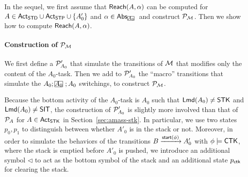 In the sequel, we first assume that ${\sf Reach}(A, \alpha)$ can be computed for $A \in {\sf Act}_{\sf STD} \cup {\sf Act}_{\sf STP} \cup \{A'_0\}$ and $\alpha \in \abs_{\mhcancel{A_0}}$ and construct ${\mathcal{P} }_{\mathcal{M} }$. Then we show how to compute ${\sf Reach}(A, \alpha)$. 

\paragraph*{Construction of ${\mathcal{P} }_{\mathcal{M} }$} 
We first define a {\WOTrPDS} ${\mathcal{P} }'_{A_0}$ that simulate the transitions of ${\mathcal{M} }$ that modifies only the content of the $A_0$-task. Then we add to ${\mathcal{P} }'_{A_0}$ the ``macro'' transitions that simulate the $A_0;\mhcancel{A_0};A_0$ switchings, to construct ${\mathcal{P} }_{\mathcal{M} }$.  

Because the bottom activity of the $A_0$-task is $A_0$ such that ${\sf Lmd}(A_0) \neq \mathsf{STK}$ and ${\sf Lmd}(A_0) \neq \mathsf{SIT}$, the construction of ${\mathcal{P} }'_{A_0}$ is slightly more involved than that of ${\mathcal{P} }_A$ for $A \in {\sf Act}_{\sf STK}$ in Section~\ref{sec:amass-stk}. In particular, we use two states $p_0, p_1$ to distinguish between whether $A'_0$ is in the stack or not. Moreover, in order to simulate the behaviors of the transitions $B \xrightarrow{{\mathsf{start} }(\phi)} A'_0$ with $\phi \models \mathsf{CTK}$, where the stack is emptied before $A'_0$ is pushed, we introduce an additional symbol $\triangleleft$ to act as the bottom symbol of the stack and an additional state $p_{\sf ctk}$ for clearing the stack. 

